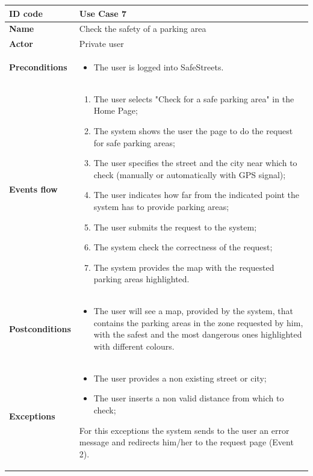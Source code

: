 \documentclass[titlepage]{article}
\begin{document}
\newpage

\begin{longtable}{| p{3 cm} | p{10 cm} |} 
\hline

\textbf{ID code} & Use Case 7 \\ \hline
\textbf{Name} & Check the safety of a parking area \\ \hline
\textbf{Actor} & Private user \\ \hline
\textbf{Preconditions} &
\begin{itemize}
\item The user is logged into SafeStreets.
\end{itemize} \\ \hline

\textbf{Events flow} &
\begin{enumerate}
\item The user selects "Check for a safe parking area" in the Home Page;
\item The system shows the user the page to do the request for safe parking areas;
\item The user specifies the street and the city near which to check (manually or automatically with GPS signal);
\item The user indicates how far from the indicated point the system has to provide parking areas;
\item The user submits the request to the system;
\item The system check the correctness of the request;
\item The system provides the map with the requested parking areas highlighted. 

\end{enumerate} \\ \hline

\textbf{Postconditions} &
\begin{itemize}
\item The user will see a map, provided by the system, that contains the parking areas in the zone requested by him, with the safest and the most dangerous ones highlighted with different colours.
\end{itemize} \\ \hline

\textbf{Exceptions} &
\begin{itemize}
\item The user provides a non existing street or city;
\item The user inserts a non valid distance from which to check;
\end{itemize}
For this exceptions the system sends to the user an error message and redirects him/her to the request page (Event 2). \\ \hline




\end{longtable}
\end{document}
